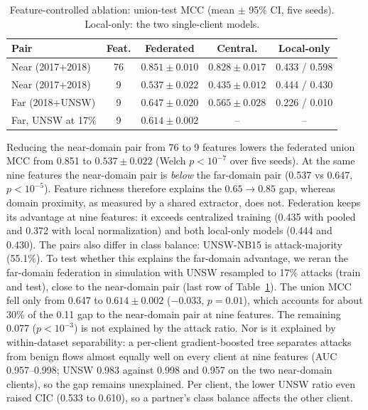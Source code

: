 \documentclass[conference,onecolumn]{IEEEtran}
\begin{document}
\begin{table}[htbp]
\caption{Feature-controlled ablation: union-test MCC (mean $\pm$ 95\% CI, five seeds). Local-only: the
two single-client models.}
\label{tab:ablate}
\begin{center}
\footnotesize
\begin{tabular}{|l|c|c|c|c|}
\hline
\textbf{Pair} & \textbf{Feat.} & \textbf{Federated} & \textbf{Central.} & \textbf{Local-only} \\
\hline
Near (2017+2018) & 76 & $0.851 \pm 0.010$ & $0.828 \pm 0.017$ & 0.433 / 0.598 \\
Near (2017+2018) & 9  & $0.537 \pm 0.022$ & $0.435 \pm 0.012$ & 0.444 / 0.430 \\
Far (2018+UNSW)  & 9  & $0.647 \pm 0.020$ & $0.565 \pm 0.028$ & 0.226 / 0.010 \\
Far, UNSW at 17\% & 9 & $0.614 \pm 0.002$ & -- & -- \\
\hline
\end{tabular}
\end{center}
\end{table}

Reducing the near-domain pair from 76 to 9 features lowers the federated union MCC from 0.851 to
$0.537 \pm 0.022$ (Welch $p<10^{-7}$ over five seeds). At the same nine features the near-domain pair
is \emph{below} the far-domain pair (0.537 vs 0.647, $p<10^{-5}$). Feature richness therefore explains
the $0.65{\to}0.85$ gap, whereas domain proximity, as measured by a shared extractor, does not. Federation
keeps its advantage at nine features: it exceeds centralized training (0.435 with pooled and 0.372 with
local normalization) and both local-only models (0.444 and 0.430). The pairs also differ in class
balance: UNSW-NB15 is attack-majority (55.1\%). To test whether this explains the far-domain advantage, we
reran the far-domain federation in simulation with UNSW resampled to 17\% attacks (train and test), close
to the near-domain pair (last row of Table~\ref{tab:ablate}). The union MCC fell only from 0.647 to
$0.614 \pm 0.002$ ($-0.033$, $p{=}0.01$), which accounts for about 30\% of the 0.11 gap to the
near-domain pair at nine features. The remaining 0.077 ($p<10^{-3}$) is not explained by the attack
ratio. Nor is it explained by within-dataset separability: a per-client gradient-boosted tree separates
attacks from benign flows almost equally well on every client at nine features (AUC 0.957--0.998; UNSW
0.983 against 0.998 and 0.957 on the two near-domain clients), so the gap remains unexplained. Per
client, the lower UNSW ratio even raised CIC (0.533 to 0.610), so a partner's class balance affects the
other client.
\end{document}
